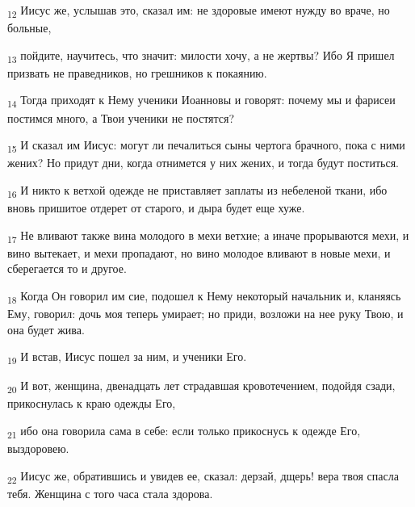 \begin{tcolorbox}
\textsubscript{12} Иисус же, услышав это, сказал им: не здоровые имеют нужду во враче, но больные,
\end{tcolorbox}
\begin{tcolorbox}
\textsubscript{13} пойдите, научитесь, что значит: милости хочу, а не жертвы? Ибо Я пришел призвать не праведников, но грешников к покаянию.
\end{tcolorbox}
\begin{tcolorbox}
\textsubscript{14} Тогда приходят к Нему ученики Иоанновы и говорят: почему мы и фарисеи постимся много, а Твои ученики не постятся?
\end{tcolorbox}
\begin{tcolorbox}
\textsubscript{15} И сказал им Иисус: могут ли печалиться сыны чертога брачного, пока с ними жених? Но придут дни, когда отнимется у них жених, и тогда будут поститься.
\end{tcolorbox}
\begin{tcolorbox}
\textsubscript{16} И никто к ветхой одежде не приставляет заплаты из небеленой ткани, ибо вновь пришитое отдерет от старого, и дыра будет еще хуже.
\end{tcolorbox}
\begin{tcolorbox}
\textsubscript{17} Не вливают также вина молодого в мехи ветхие; а иначе прорываются мехи, и вино вытекает, и мехи пропадают, но вино молодое вливают в новые мехи, и сберегается то и другое.
\end{tcolorbox}
\begin{tcolorbox}
\textsubscript{18} Когда Он говорил им сие, подошел к Нему некоторый начальник и, кланяясь Ему, говорил: дочь моя теперь умирает; но приди, возложи на нее руку Твою, и она будет жива.
\end{tcolorbox}
\begin{tcolorbox}
\textsubscript{19} И встав, Иисус пошел за ним, и ученики Его.
\end{tcolorbox}
\begin{tcolorbox}
\textsubscript{20} И вот, женщина, двенадцать лет страдавшая кровотечением, подойдя сзади, прикоснулась к краю одежды Его,
\end{tcolorbox}
\begin{tcolorbox}
\textsubscript{21} ибо она говорила сама в себе: если только прикоснусь к одежде Его, выздоровею.
\end{tcolorbox}
\begin{tcolorbox}
\textsubscript{22} Иисус же, обратившись и увидев ее, сказал: дерзай, дщерь! вера твоя спасла тебя. Женщина с того часа стала здорова.
\end{tcolorbox}
